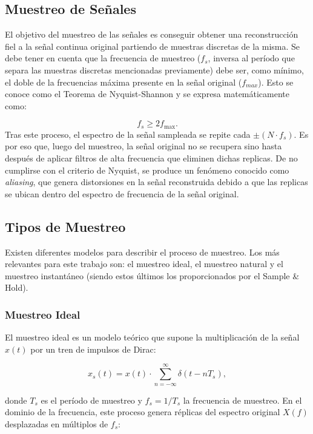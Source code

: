 
\subsection{Muestreo de Señales}
El objetivo del muestreo de las señales es conseguir obtener una reconstrucción fiel a la señal continua original partiendo de muestras discretas de la misma.
Se debe tener en cuenta que la frecuencia de muestreo ($f_s$, inversa al período que separa las muestras discretas mencionadas previamente) debe ser, como mínimo, el doble de la frecuencias máxima presente en la señal original ($f_{max}$). Esto se conoce como el Teorema de Nyquist-Shannon y se expresa matemáticamente como:

\begin{equation}
    f_s \geq 2 f_{\max}.
\end{equation}
Tras este proceso, el espectro de la señal sampleada se repite cada $\pm (N\cdot f_s)$. Es por eso que, luego del muestreo, la señal original no se recupera sino hasta después de aplicar filtros de alta frecuencia que eliminen dichas replicas.
De no cumplirse con el criterio de Nyquist, se produce un fenómeno conocido como \textit{aliasing}, que genera distorsiones en la señal reconstruida debido a que las replicas se ubican dentro del espectro de frecuencia de la señal original.

\subsection{Tipos de Muestreo}
Existen diferentes modelos para describir el proceso de muestreo. Los más relevantes para este trabajo son: el muestreo ideal, el muestreo natural y el muestreo instantáneo (siendo estos últimos los proporcionados por el Sample \& Hold).

\subsubsection{Muestreo Ideal}
El muestreo ideal es un modelo teórico que supone la multiplicación de la señal $x(t)$ por un tren de impulsos de Dirac:

\begin{equation}
    x_s(t) = x(t) \cdot \sum_{n=-\infty}^{\infty} \delta(t-nT_s),
\end{equation}

donde $T_s$ es el período de muestreo y $f_s = 1/T_s$ la frecuencia de muestreo.  
En el dominio de la frecuencia, este proceso genera réplicas del espectro original $X(f)$ desplazadas en múltiplos de $f_s$:

